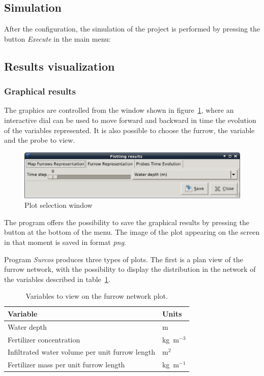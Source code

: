 \documentclass[review,authoryear]{elsarticle}
\begin{document}
\subsection{Simulation}

After the configuration, the simulation of the project is performed by pressing
the button \emph{Execute} in the main menu:

\subsection{Results visualization}

\subsubsection{Graphical results}

The graphics are controlled from the window shown in figure~\ref{barraRepres},
where an interactive dial can be used to move forward and backward in time the
evolution of the variables represented. It is also possible to choose the
furrow, the variable and the probe to view. 

\begin{figure}[!ht]
\begin{center}
\includegraphics[width=706\UNIT]{menuRepresEN.eps}
\caption{Plot selection window}\label{barraRepres}
\end{center}
\end{figure}

The program offers the possibility to save the graphical results by pressing the
button at the bottom of the menu. The image of the plot appearing on the screen
in that moment is saved in format \emph{png}.

Program \emph{Surcos} produces three types of plots. The first is a plan view of
the furrow network, with the possibility to display the distribution in the
network of the variables described in table~\ref{tableVariablesMapa}.

\begin{table}[h]\footnotesize
\caption{Variables to view on the furrow network plot.}
\label{tableVariablesMapa}
\begin{center}
\begin{tabular}{ll}
\hline
Variable & Units \\
\hline
Water depth & m \\
Fertilizer concentration & kg~m$^{-3}$\\
Infiltrated water volume per unit furrow length & m$^2$ \\
Fertilizer mass per unit furrow length & kg~m$^{-1}$ \\
\hline
\end{tabular}
\end{center}
\end{table}
\end{document}
